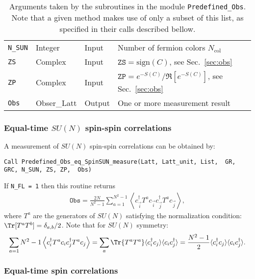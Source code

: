 \begin{table}[h]
\begin{center}
\begin{tabular}{@{} p{}  p{} p{} p{}  @{}}
			\texttt{N\_SUN}               & Integer    & Input  & Number of fermion colors $N_{\mathrm{col}}$\\
			\texttt{ZS}                   & Complex    & Input  & $\texttt{ZS} = \text{sign}(C)$, see Sec.~\ref{sec:obs}\\
			\texttt{ZP}                   & Complex    & Input  & $\texttt{ZP} = e^{-S(C)}/\Re \left[e^{-S(C)} \right]$, see Sec.~\ref{sec:obs}\\
			\texttt{Obs}                  & Obser\_Latt& Output & One or more measurement result\\
			\bottomrule
		\end{tabular}
		\caption{Arguments taken by the subroutines in the module \texttt{Predefined\_Obs}. Note that a given method makes use of only a subset of this list, as specified in their calls described bellow.}		\label{table:predefined_obs}
	\end{center}
\end{table}


\subsubsection{Equal-time $SU(N)$ spin-spin correlations}

A measurement of $SU(N)$ spin-spin correlations can be obtained by:

\begin{lstlisting}[style=fortran]
Call Predefined_Obs_eq_SpinSUN_measure(Latt, Latt_unit, List,  GR, GRC, N_SUN, ZS, ZP,  Obs)
\end{lstlisting}

If \texttt{N\_FL = 1} then  this routine returns
\begin{align}
\texttt{Obs} = \frac{2N}{N^2-1}\sum_{a=1}^{N^2 - 1}  \left\langle c^{\dagger}_{\vec{i}} T^a c_{\vec{i}}  c^{\dagger}_{\vec{j}} T^a  c_{\vec{j}}\right\rangle,
\end{align}
where $T^a$ are the generators of $SU(N)$ satisfying the normalization condition:  $\Tr [ T^a  T^b ]= \delta_{a,b}/2$. Note that for $SU(N)$ symmetry:
\begin{align}
\sum_{a=1}{N^2 - 1 }  \left\langle c^{\dagger}_i T^a c_i  c^{\dagger}_j T^a  c_j\right\rangle   = \sum_{a} \Tr{T^a T^a} \langle c^{\dagger}_i c_j\rangle \langle c_i c^{\dagger}_j\rangle = \frac{N^2 -1}{2} \langle c^{\dagger}_i c_j\rangle \langle c_i c^{\dagger}_j\rangle.
\end{align}

\subsubsection{Equal-time spin correlations}

